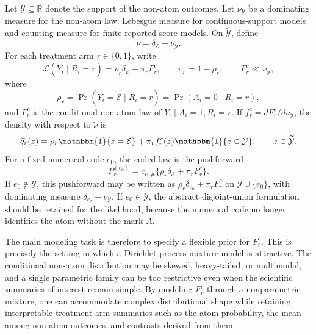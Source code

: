 \documentclass[11pt]{article}
\begin{document}
Let $\mathcal{Y}\subseteq\mathbb{R}$ denote the support of the non-atom outcomes. Let $\nu_{\mathcal{Y}}$ be a dominating measure for the non-atom law: Lebesgue measure for continuous-support models and counting measure for finite reported-score models. On $\widetilde{\mathcal{Y}}$, define
\[
  \widetilde{\nu}=\delta_{\mathcal{E}}+\nu_{\mathcal{Y}}.
\]
For each treatment arm $r\in\{0,1\}$, write
\begin{equation*}
  \mathcal{L}(\widetilde{Y}_i \mid R_i = r)
  = \rho_r \delta_{\mathcal{E}} + \pi_r F_r^c,
  \qquad
  \pi_r = 1 - \rho_r,
  \qquad
  F_r^c \ll \nu_{\mathcal{Y}},
\end{equation*}
where
\[
  \rho_r=\Pr(\widetilde{Y}_i=\mathcal{E}\mid R_i=r)=\Pr(A_i=0\mid R_i=r),
\]
and $F_r^c$ is the conditional non-atom law of $Y_i\mid A_i=1,R_i=r$. If $f_r^c=dF_r^c/d\nu_{\mathcal{Y}}$, the density with respect to $\widetilde{\nu}$ is
\[
  \widetilde{q}_r(z)
  =\rho_r\mathbbm{1}\{z=\mathcal{E}\}
   +\pi_r f_r^c(z)\mathbbm{1}\{z\in\mathcal{Y}\},
  \qquad z\in\widetilde{\mathcal{Y}}.
\]
For a fixed numerical code $e_0$, the coded law is the pushforward
\[
  P_r^{(e_0)}=c_{e_0\#}\{\rho_r\delta_{\mathcal{E}}+\pi_rF_r^c\}.
\]
If $e_0\notin\mathcal{Y}$, this pushforward may be written as $\rho_r\delta_{e_0}+\pi_rF_r^c$ on $\mathcal{Y}\cup\{e_0\}$, with dominating measure $\delta_{e_0}+\nu_{\mathcal{Y}}$. If $e_0\in\mathcal{Y}$, the abstract disjoint-union formulation should be retained for the likelihood, because the numerical code no longer identifies the atom without the mark $A$.

The main modeling task is therefore to specify a flexible prior for $F_r^c$. This is precisely the setting in which a Dirichlet process mixture model is attractive. The conditional non-atom distribution may be skewed, heavy-tailed, or multimodal, and a single parametric family can be too restrictive even when the scientific summaries of interest remain simple. By modeling $F_r^c$ through a nonparametric mixture, one can accommodate complex distributional shape while retaining interpretable treatment-arm summaries such as the atom probability, the mean among non-atom outcomes, and contrasts derived from them.
\end{document}
